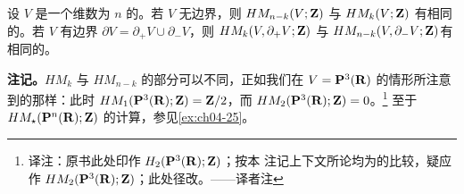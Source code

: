 \begin{proposition}%
\label{thm:poincare-duality-oriented}
设 $V$ 是一个维数为 $n$ 的\trCompact{}\trOrientation{}\trManifold。若 $V$ 无边界，则%
\trAbelianGroup{} $HM_{n-k}(V;\mathbf{Z})$ 与 $HM_k(V;\mathbf{Z})$ 有相同的\trRank。若 $V$ 有边界
$\partial V=\partial_+V\cup\partial_-V$，则\trAbelianGroup{} $HM_k(V,\partial_+V;\mathbf{Z})$
与 $HM_{n-k}(V,\partial_-V;\mathbf{Z})$\linebreak 有相同的\trRank。\noqed
\end{proposition}

\noindent\textbf{注记。}$HM_k$ 与 $HM_{n-k}$ 的\trTorsion{}部分可以不同，正如我们在
$V=\mathbf{P}^3(\mathbf{R})$ 的情形所注意到的那样：此时 $HM_1(\mathbf{P}^3(\mathbf{R});\mathbf{Z})=\mathbf{Z}/2$，而
$HM_2(\mathbf{P}^3(\mathbf{R});\mathbf{Z})=0$。\footnote{译注：原书此处印作 $H_2(\mathbf{P}^3(\mathbf{R});\mathbf{Z})$；按本
注记上下文所论均为\trMorseHomology{}的\trTorsion{}比较，疑应作
$HM_2(\mathbf{P}^3(\mathbf{R});\mathbf{Z})$；此处径改。——译者注}
至于 $HM_\star(\mathbf{P}^n(\mathbf{R});\mathbf{Z})$ 的计算，参见\cref{ex:ch04-25}。

